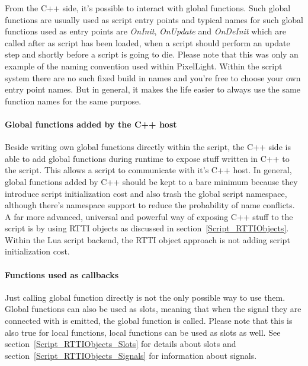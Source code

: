 From the C++ side, it's possible to interact with global functions. Such global functions are usually used as script entry points and typical names for such global functions used as entry points are \emph{OnInit}, \emph{OnUpdate} and \emph{OnDeInit} which are called after as script has been loaded, when a script should perform an update step and shortly before a script is going to die. Please note that this was only an example of the naming convention used within PixelLight. Within the script system there are no such fixed build in names and you're free to choose your own entry point names. But in general, it makes the life easier to always use the same function names for the same purpose.


\paragraph{Global functions added by the C++ host}
Beside writing own global functions directly within the script, the C++ side is able to add global functions during runtime to expose stuff written in C++ to the script. This allows a script to communicate with it's C++ host. In general, global functions added by C++ should be kept to a bare minimum because they introduce script initialization cost and also trash the global script namespace, although there's namespace support to reduce the probability of name conflicts. A far more advanced, universal and powerful way of exposing C++ stuff to the script is by using RTTI objects as discussed in section~\ref{Script_RTTIObjects}. Within the Lua script backend, the RTTI object approach is not adding script initialization cost.


\paragraph{Functions used as callbacks}
Just calling global function directly is not the only possible way to use them. Global functions can also be used as slots, meaning that when the signal they are connected with is emitted, the global function is called. Please note that this is also true for local functions, local functions can be used as slots as well. See section~\ref{Script_RTTIObjects_Slots} for details about slots and section~\ref{Script_RTTIObjects_Signals} for information about signals.

